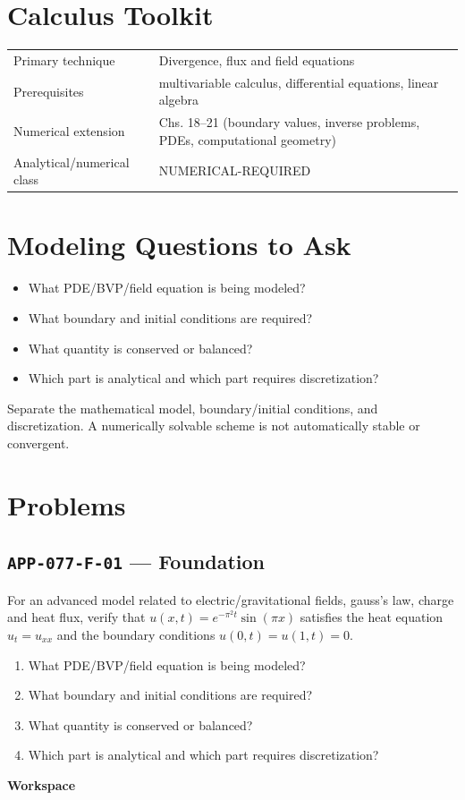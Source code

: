 \documentclass[11pt]{book}
\newcommand{\pid}[1]{\texttt{#1}}
\newcommand{\workspace}{\par\vspace{0.7in}\hrulefill\par\vspace{0.55in}\hrulefill\par}
\begin{document}
\section*{Calculus Toolkit}
\begin{tabularx}{\textwidth}{@{}lX@{}}\toprule
Primary technique & Divergence, flux and field equations \\
Prerequisites & multivariable calculus, differential equations, linear algebra \\
Numerical extension & Chs. 18–21 (boundary values, inverse problems, PDEs, computational geometry) \\
Analytical/numerical class & NUMERICAL-REQUIRED \\
\bottomrule\end{tabularx}
\section*{Modeling Questions to Ask}\begin{itemize}
\item What PDE/BVP/field equation is being modeled?
\item What boundary and initial conditions are required?
\item What quantity is conserved or balanced?
\item Which part is analytical and which part requires discretization?
\end{itemize}
\begin{errorbox}Separate the mathematical model, boundary/initial conditions, and discretization. A numerically solvable scheme is not automatically stable or convergent.\end{errorbox}
\section*{Problems}
\subsection*{\pid{APP-077-F-01} — Foundation}
\begin{problembox}
For an advanced model related to electric/gravitational fields, gauss's law, charge and heat flux, verify that $u(x,t)=e^{-\pi^2t}\sin(\pi x)$ satisfies the heat equation $u_t=u_{xx}$ and the boundary conditions $u(0,t)=u(1,t)=0$.
\end{problembox}
\begin{promptbox}\begin{enumerate}
\item What PDE/BVP/field equation is being modeled?
\item What boundary and initial conditions are required?
\item What quantity is conserved or balanced?
\item Which part is analytical and which part requires discretization?
\end{enumerate}\end{promptbox}
\textbf{Workspace}\workspace
{}
\end{document}
